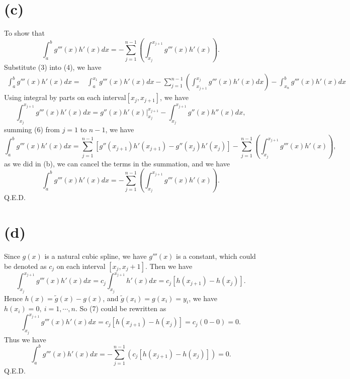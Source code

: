 \documentclass{article}
\begin{document}
\section*{(c)}
To show that 
\begin{equation}
    \int_{a}^{b}g'''(x)h'(x)dx = - \sum_{j=1}^{n-1}\left(\int_{x_j}^{x_{j+1}}g'''(x)h'(x)\right).
\end{equation}
Substitute (3) into (4), we have
\begin{align*}
    \int_{a}^{b}g'''(x)h'(x)dx = &\int_{a}^{x_1} g'''(x)h'(x)dx -
    \sum_{j=1}^{n - 1} \left(\int_{x_{j+1}}^{x_j} g'''(x) h'(x)dx 
    \right) -\int_{x_n}^{b} g'''(x)h'(x)dx 
\end{align*}
Using integral by parts on each interval$[x_j, x_{j+1}]$, we have
\begin{equation}
    \int_{x_j} ^{x_{j+1}} g'''(x)h'(x)dx = g''(x)h'(x) \big|_{x_j}^{x_{j+1}} - \int_{x_j}^{x_{j+1}} g''(x)h''(x)dx,
\end{equation}
summing (6) from $j = 1$ to $n - 1$, we have
\begin{equation*}
    \int_{a}^{b}g'''(x)h'(x)dx = 
    \sum_{j=1}^{n-1}\left[g''(x_{j+1})h'(x_{j+1}) - g''(x_{j})h'(x_{j})\right] - \sum_{j=1}^{n-1}\left(\int_{x_j}^{x_{j+1}}g'''(x)h'(x)\right),
\end{equation*}
as we did in (b), we can cancel the terms in the summation, and we have
\begin{equation*}
    \int_{a}^{b}g'''(x)h'(x)dx = - \sum_{j=1}^{n-1}\left(\int_{x_j}^{x_{j+1}}g'''(x)h'(x)\right).
\end{equation*}
Q.E.D.


\section*{(d)}
Since $g(x)$ is a natural cubic spline, we have $g'''(x)$ is a constant, which could be denoted as $c_j$ on each interval $[x_j, x_j+1]$. 
Then we have
\begin{equation}
    \int_{x_{j}}^{x_{j+1}}g'''(x)h'(x)dx = c_j \int_{x_{j}}^{x_{j+1}}h'(x)dx = c_j \left[h(x_{j+1}) - h(x_j)\right].
\end{equation}
Hence $h(x) = \tilde{g}(x) - g(x)$, and $\tilde{g}(x_i) = g(x_i) = y_i$, we have $h(x_i) = 0, \ i = 1, \cdots, n$.
So (7) could be rewritten as 
\begin{equation*}
    \int_{x_{j}}^{x_{j+1}}g'''(x)h'(x)dx = c_j \left[h(x_{j+1}) - h(x_j)\right] = c_j (0 - 0) = 0.
\end{equation*}
Thus we have
\begin{equation*}
    \int_{a}^{b}g'''(x)h'(x)dx = - \sum_{j=1}^{n-1}\left(c_j \left[h(x_{j+1}) - h(x_j)\right]\right) = 0.
\end{equation*}
Q.E.D.
\end{document}
